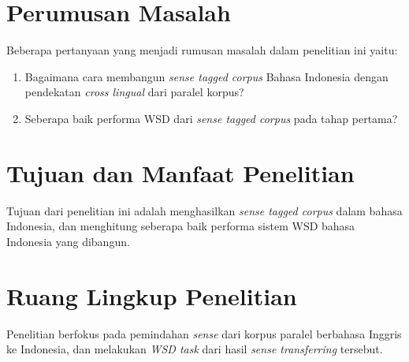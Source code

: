 \section{Perumusan Masalah}
Beberapa pertanyaan yang menjadi rumusan masalah dalam penelitian ini yaitu:
\begin{enumerate}
	\item Bagaimana cara membangun \textit{sense tagged corpus} Bahasa Indonesia dengan pendekatan \textit{cross lingual} dari paralel korpus?
	\item Seberapa baik performa WSD dari \textit{sense tagged corpus} pada tahap pertama?
\end{enumerate}

\section{Tujuan dan Manfaat Penelitian}
Tujuan dari penelitian ini adalah menghasilkan \textit{sense tagged corpus} dalam bahasa Indonesia, dan menghitung seberapa baik performa sistem WSD bahasa Indonesia yang dibangun.
\section{Ruang Lingkup Penelitian}
Penelitian berfokus pada pemindahan \textit{sense} dari korpus paralel berbahasa Inggris ke Indonesia, dan melakukan \textit{WSD task} dari hasil \textit{sense transferring} tersebut.
